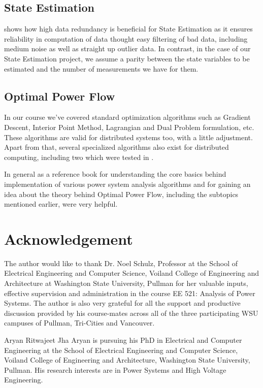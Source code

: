 \documentclass[journal]{IEEEtran}
\begin{document}
\subsection{State Estimation}
\cite{gomez_exposito_multilevelStateEstimationParadigm} shows how high data redundancy is beneficial for State Estimation as it ensures reliability in computation of data thought easy filtering of bad data, including medium noise as well as straight up outlier data. In contrast, in the case of our State Estimation project, we assume a parity between the state variables to be estimated and the number of measurements we have for them.

\subsection{Optimal Power Flow}
In our course we've covered standard optimization algorithms such as Gradient Descent, Interior Point Method, Lagrangian and Dual Problem formulation, etc. These algorithms are valid for distributed systems too, with a little adjustment. Apart from that, several specialized algorithms also exist for distributed computing, including two which were tested in \cite{aladinAlgorithmPaper}.

In general \cite{crow01} as a reference book for understanding the core basics behind implementation of various power system analysis algorithms and \cite{rebennack_frank_aPrimerOnOPF} for gaining an idea about the theory behind Optimal Power Flow, including the subtopics mentioned earlier, were very helpful.
 
\section*{Acknowledgement}
The author would like to thank Dr. Noel Schulz, Professor at the School of Electrical Engineering and Computer Science, Voiland College of Engineering and Architecture at Washington State University, Pullman for her valuable inputs, effective supervision and administration in the course EE 521: Analysis of Power Systems. The author is also very grateful for all the support and productive discussion provided by his course-mates across all of the three participating WSU campuses of Pullman, Tri-Cities and Vancouver.

\begin{IEEEbiography}
	{Aryan Ritwajeet Jha}
	Aryan is pursuing his PhD in Electrical and Computer Engineering at the School of Electrical Engineering and Computer Science,  Voiland College of Engineering and Architecture, Washington State University, Pullman. His research interests are in Power Systems and High Voltage Engineering.
\end{IEEEbiography}

\printbibliography
\end{document}
